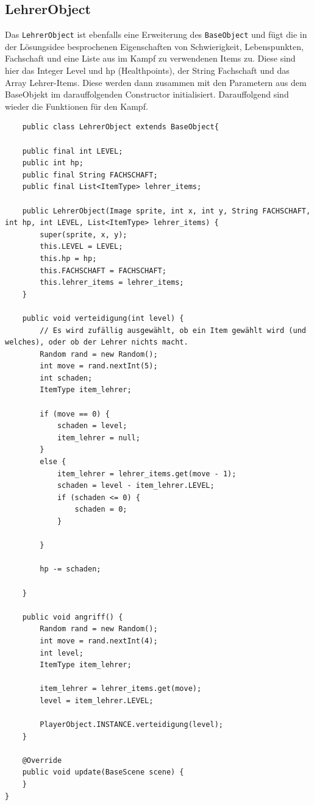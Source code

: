 \subsection{LehrerObject}
Das \texttt{LehrerObject} ist ebenfalls eine Erweiterung des \texttt{BaseObject} und fügt die in der Lösungsidee besprochenen Eigenschaften von Schwierigkeit, Lebenspunkten, Fachschaft und eine Liste aus im Kampf zu verwendenen Items zu. Diese sind hier das Integer Level und hp (Healthpoints), der String Fachschaft und das Array Lehrer-Items. Diese werden dann zusammen mit den Parametern aus dem BaseObjekt im darauffolgenden Constructor initialisiert. Darauffolgend sind wieder die Funktionen für den Kampf.
\\
\begin{lstlisting}
    public class LehrerObject extends BaseObject{

    public final int LEVEL;
    public int hp;
    public final String FACHSCHAFT;
    public final List<ItemType> lehrer_items;

    public LehrerObject(Image sprite, int x, int y, String FACHSCHAFT, int hp, int LEVEL, List<ItemType> lehrer_items) {
        super(sprite, x, y);
        this.LEVEL = LEVEL;
        this.hp = hp;
        this.FACHSCHAFT = FACHSCHAFT;
        this.lehrer_items = lehrer_items;
    }

    public void verteidigung(int level) {
        // Es wird zufällig ausgewählt, ob ein Item gewählt wird (und welches), oder ob der Lehrer nichts macht.
        Random rand = new Random();
        int move = rand.nextInt(5);
        int schaden;
        ItemType item_lehrer;

        if (move == 0) {
            schaden = level;
            item_lehrer = null;
        }
        else {
            item_lehrer = lehrer_items.get(move - 1);
            schaden = level - item_lehrer.LEVEL;
            if (schaden <= 0) {
                schaden = 0;
            }

        }

        hp -= schaden;

    }
    
    public void angriff() {
        Random rand = new Random();
        int move = rand.nextInt(4);
        int level;
        ItemType item_lehrer;
        
        item_lehrer = lehrer_items.get(move);
        level = item_lehrer.LEVEL;
        
        PlayerObject.INSTANCE.verteidigung(level);
    }

    @Override
    public void update(BaseScene scene) {
    }
}
\end{lstlisting}

